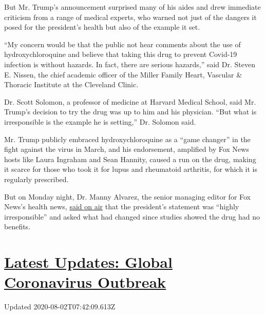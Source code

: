But Mr. Trump's announcement surprised many of his aides and drew
immediate criticism from a range of medical experts, who warned not just
of the dangers it posed for the president's health but also of the
example it set.

``My concern would be that the public not hear comments about the use of
hydroxychloroquine and believe that taking this drug to prevent Covid-19
infection is without hazards. In fact, there are serious hazards,'' said
Dr. Steven E. Nissen, the chief academic officer of the Miller Family
Heart, Vascular \& Thoracic Institute at the Cleveland Clinic.

Dr. Scott Solomon, a professor of medicine at Harvard Medical School,
said Mr. Trump's decision to try the drug was up to him and his
physician. ``But what is irresponsible is the example he is setting,''
Dr. Solomon said.

Mr. Trump publicly embraced hydroxychloroquine as a ``game changer'' in
the fight against the virus in March, and his endorsement, amplified by
Fox News hosts like Laura Ingraham and Sean Hannity, caused a run on the
drug, making it scarce for those who took it for lupus and rheumatoid
arthritis, for which it is regularly prescribed.

But on Monday night, Dr. Manny Alvarez, the senior managing editor for
Fox News's health news,
\href{https://twitter.com/justinbaragona/status/1262508060410613765}{said
on air} that the president's statement was ``highly irresponsible'' and
asked what had changed since studies showed the drug had no benefits.

\hypertarget{latest-updates-global-coronavirus-outbreak}{%
\section{\texorpdfstring{\href{https://www.nytimes.com/2020/08/01/world/coronavirus-covid-19.html?action=click\&pgtype=Article\&state=default\&region=MAIN_CONTENT_1\&context=storylines_live_updates}{Latest
Updates: Global Coronavirus
Outbreak}}{Latest Updates: Global Coronavirus Outbreak}}\label{latest-updates-global-coronavirus-outbreak}}

Updated 2020-08-02T07:42:09.613Z


